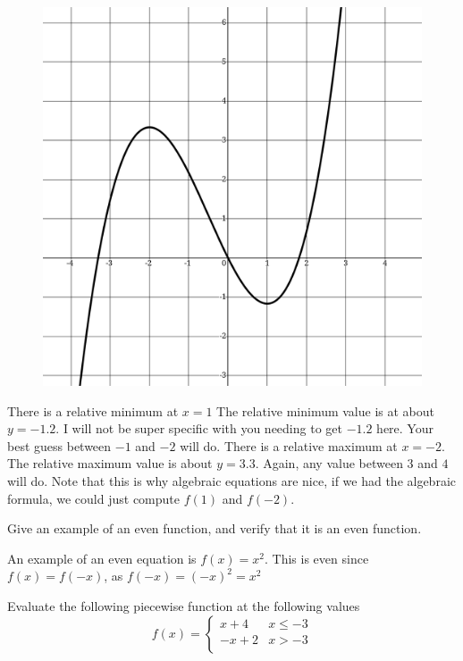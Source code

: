 \documentclass[addpoints,12pt]{exam}
\begin{document}
\begin{questions}
\begin{figure}[htb!]
  \centering
  \includegraphics[scale = 0.1]{minmax}
\end{figure}

\begin{solution}
    There is a relative minimum at $x =1 $ The relative minimum value is at about $y = -1.2 $. I will not be super specific with you needing to get $-1.2$ here. Your best guess between $-1$ and $-2$ will do. There is a relative maximum at $x = -2$. The relative maximum value is about  $y = 3.3$. Again, any value between $3$ and $4$ will do. Note that this is why algebraic equations are nice, if we had the algebraic formula, we could just compute $f(1)$ and $f(-2)$. 
\end{solution}

\question Give an example of an even function, and verify that it is an even function. 

\begin{solution}
	An example of an even equation is $f(x)= x^{2}$. This is even since $f(x) = f(-x)$, as $f(-x) = (-x)^{2} = x^{2}$
\end{solution}

\question Evaluate the following piecewise function at the following values
\[
	f(x) =
	\begin{cases}
   x+4 & x\leq -3 \\
	 -x+2 & x> -3 \\
	\end{cases}
\]


\end{questions}
\end{document}
